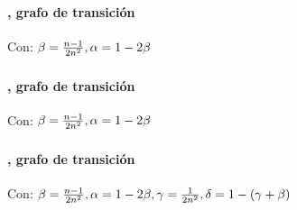 \documentclass[../main.tex]{subfiles}
\begin{document}
\begin{frame}
  \frametitle{\SECTIOND}
  \framesubtitle{\EJE, grafo de transición}

  Con: \(\beta = \frac{n-1}{2n^{2}}, \alpha = 1 - 2\beta\)

  \begin{figure}[H]
    \centering
  \end{figure}
\end{frame}

\begin{frame}
  \frametitle{\SECTIOND}
  \framesubtitle{\EJE, grafo de transición}

  Con: \(\beta = \frac{n-1}{2n^{2}}, \alpha = 1 - 2\beta\)

  \begin{figure}[H]
    \centering
  \end{figure}
\end{frame}

\begin{frame}
  \frametitle{\SECTIOND}
  \framesubtitle{\EJE, grafo de transición}

  Con: \(\beta = \frac{n-1}{2n^{2}}, \alpha = 1 - 2\beta, \gamma = \frac{1}{2n^{2}}, \delta = 1 - (\gamma + \beta)\)

  \begin{figure}[H]
    \centering
  \end{figure}
\end{frame}
\end{document}
